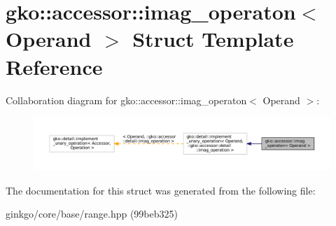 \hypertarget{structgko_1_1accessor_1_1imag__operaton}{}\section{gko\+:\+:accessor\+:\+:imag\+\_\+operaton$<$ Operand $>$ Struct Template Reference}
\label{structgko_1_1accessor_1_1imag__operaton}


Collaboration diagram for gko\+:\+:accessor\+:\+:imag\+\_\+operaton$<$ Operand $>$\+:
\nopagebreak
\begin{figure}[H]
\begin{center}
\leavevmode
\includegraphics[width=350pt]{structgko_1_1accessor_1_1imag__operaton__coll__graph}
\end{center}
\end{figure}


The documentation for this struct was generated from the following file\+:\begin{DoxyCompactItemize}
\item 
ginkgo/core/base/range.\+hpp (99beb325)\end{DoxyCompactItemize}
